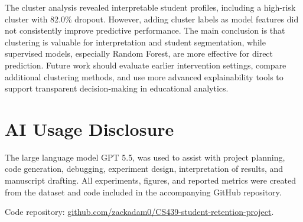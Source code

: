 \documentclass{article}
\begin{document}
The cluster analysis revealed interpretable student profiles, including a high-risk cluster with 82.0\% dropout. However, adding cluster labels as model features did not consistently improve predictive performance. The main conclusion is that clustering is valuable for interpretation and student segmentation, while supervised models, especially Random Forest, are more effective for direct prediction. Future work should evaluate earlier intervention settings, compare additional clustering methods, and use more advanced explainability tools to support transparent decision-making in educational analytics.


\section*{AI Usage Disclosure}
The large language model GPT 5.5, was used to assist with project planning, code generation, debugging, experiment design, interpretation of results, and manuscript drafting. All experiments, figures, and reported metrics were created from the dataset and code included in the accompanying GitHub repository.

Code repository: \href{https://github.com/zackadam0/CS439-student-retention-project}{github.com/zackadam0/CS439-student-retention-project}.



\end{document}
